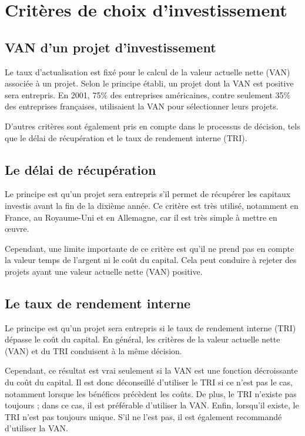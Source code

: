 \documentclass[a4paper, 12pt]{report}
\begin{document}
\chapter{Critères de  choix d'investissement}


\section{VAN d'un projet d’investissement}

Le taux d'actualisation est fixé pour le calcul de la valeur actuelle nette (VAN) associée à un projet. Selon le principe établi, un projet dont la VAN est positive sera entrepris. En 2001, 75\% des entreprises américaines, contre seulement 35\% des entreprises françaises, utilisaient la VAN pour sélectionner leurs projets.

D'autres critères sont également pris en compte dans le processus de décision, tels que le délai de récupération et le taux de rendement interne (TRI).

\section{Le délai de récupération}

Le principe est qu'un projet sera entrepris s'il permet de récupérer les capitaux investis avant la fin de la dixième année. Ce critère est très utilisé, notamment en France, au Royaume-Uni et en Allemagne, car il est très simple à mettre en œuvre.

Cependant, une limite importante de ce critère est qu'il ne prend pas en compte la valeur temps de l'argent ni le coût du capital. Cela peut conduire à rejeter des projets ayant une valeur actuelle nette (VAN) positive.

\section{Le taux de rendement interne}

Le principe est qu'un projet sera entrepris si le taux de rendement interne (TRI) dépasse le coût du capital. En général, les critères de la valeur actuelle nette (VAN) et du TRI conduisent à la même décision.

Cependant, ce résultat est vrai seulement si la VAN est une fonction décroissante du coût du capital. Il est donc déconseillé d'utiliser le TRI si ce n'est pas le cas, notamment lorsque les bénéfices précèdent les coûts. De plus, le TRI n'existe pas toujours ; dans ce cas, il est préférable d'utiliser la VAN. Enfin, lorsqu'il existe, le TRI n'est pas toujours unique. S'il ne l'est pas, il est également recommandé d'utiliser la VAN.
\end{document}
